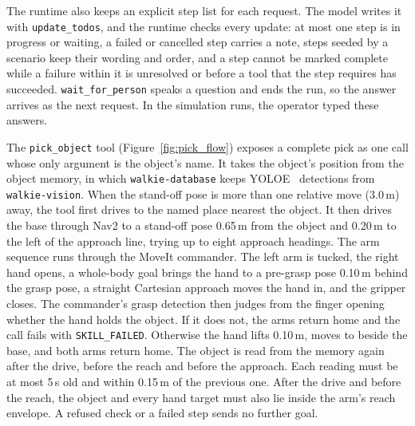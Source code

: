 \documentclass[12pt,a4paper]{article}
\begin{document}
The runtime also keeps an explicit step list for each request. The model writes it with
\texttt{update\_todos}, and the runtime checks every update: at most one step is in progress or waiting,
a failed or cancelled step carries a note, steps seeded by a scenario keep their wording and order, and a
step cannot be marked complete while a failure within it is unresolved or before a tool that the step
requires has succeeded. \texttt{wait\_for\_person} speaks a question and ends the run, so the answer
arrives as the next request. In the simulation runs, the operator typed these answers.

The \texttt{pick\_object} tool (Figure~\ref{fig:pick_flow}) exposes a complete pick as one call whose
only argument is the object's name. It takes the object's position from the object memory, in which
\texttt{walkie-database} keeps YOLOE~\cite{wang2025yoloe} detections from \texttt{walkie-vision}. When
the stand-off pose is more than one relative move (3.0\,m) away, the tool first drives to the named
place nearest the object. It then drives the base through Nav2 to a stand-off pose 0.65\,m from the
object and 0.20\,m to the left of the approach line, trying up to eight approach headings. The arm
sequence runs through the MoveIt commander. The left arm is tucked, the right hand opens, a whole-body
goal brings the hand to a pre-grasp pose 0.10\,m behind the grasp pose, a straight Cartesian approach
moves the hand in, and the gripper closes. The commander's grasp detection then judges from the finger
opening whether the hand holds the object. If it does not, the arms return home and the call fails with
\texttt{SKILL\_FAILED}. Otherwise the hand lifts 0.10\,m, moves to beside the base, and both arms return
home. The object is read from the memory again after the drive, before the reach and before the
approach. Each reading must be at most 5\,s old and within 0.15\,m of the previous one. After the drive
and before the reach, the object and every hand target must also lie inside the arm's reach envelope. A
refused check or a failed step sends no further goal.
\end{document}
